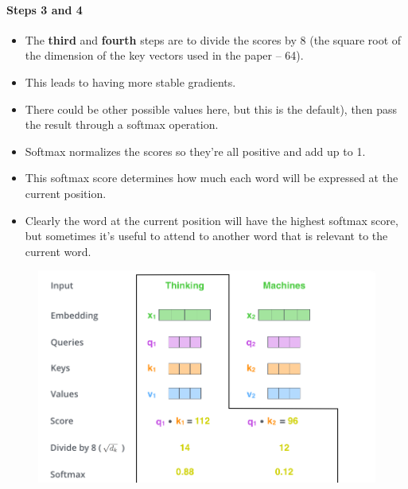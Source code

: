\paragraph{Steps 3 and 4}
\begin{itemize}
\item The \textbf{third} and \textbf{fourth} steps are to divide the scores by 8 (the square root of the dimension of the key vectors used in the paper – 64).

\item This leads to having more stable gradients. 

\item There could be other possible values here, but this is the default), then pass the result through a softmax operation. 

\item Softmax normalizes the scores so they’re all positive and add up to 1.

\item This softmax score determines how much each word will be expressed at the current position. 

\item Clearly the word at the current position will have the highest softmax score, but sometimes it’s useful to attend to another word that is relevant to the current word.

\end{itemize}


\begin{figure}[h]
        	\includegraphics[scale = 0.35]{pics/self-attention_softmax.png}
        \end{figure} 


